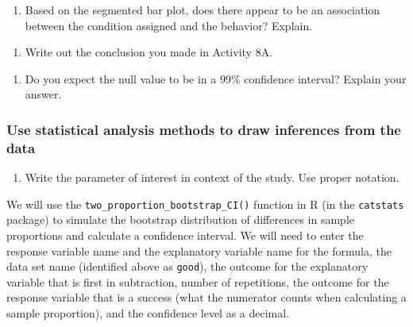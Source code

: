 \documentclass[
]{report}
\providecommand{\tightlist}{%
  \setlength{\itemsep}{0pt}\setlength{\parskip}{0pt}}
\begin{document}
\vspace{1.5in}

\begin{enumerate}
\def\labelenumi{\arabic{enumi}.}
\setcounter{enumi}{2}
\tightlist
\item
  Based on the segmented bar plot, does there appear to be an association between the condition assigned and the behavior? Explain.
\end{enumerate}

\vspace{1in}

\begin{enumerate}
\def\labelenumi{\arabic{enumi}.}
\setcounter{enumi}{3}
\tightlist
\item
  Write out the conclusion you made in Activity 8A.
\end{enumerate}

\vspace{0.8in}

\begin{enumerate}
\def\labelenumi{\arabic{enumi}.}
\setcounter{enumi}{4}
\tightlist
\item
  Do you expect the null value to be in a 99\% confidence interval? Explain your answer.
\end{enumerate}

\vspace{0.8in}

\hypertarget{use-statistical-analysis-methods-to-draw-inferences-from-the-data-2}{%
\subsubsection*{Use statistical analysis methods to draw inferences from the data}\label{use-statistical-analysis-methods-to-draw-inferences-from-the-data-2}}

\begin{enumerate}
\def\labelenumi{\arabic{enumi}.}
\setcounter{enumi}{5}
\tightlist
\item
  Write the parameter of interest in context of the study. Use proper notation.
\end{enumerate}

\vspace{1in}

We will use the \texttt{two\_proportion\_bootstrap\_CI()} function in R (in the \texttt{catstats} package) to simulate the bootstrap distribution of differences in sample proportions and calculate a confidence interval. We will need to enter the response variable name and the explanatory variable name for the formula, the data set name (identified above as \texttt{good}), the outcome for the explanatory variable that is first in subtraction, number of repetitions, the outcome for the response variable that is a success (what the numerator counts when calculating a sample proportion), and the confidence level as a decimal.
\end{document}
